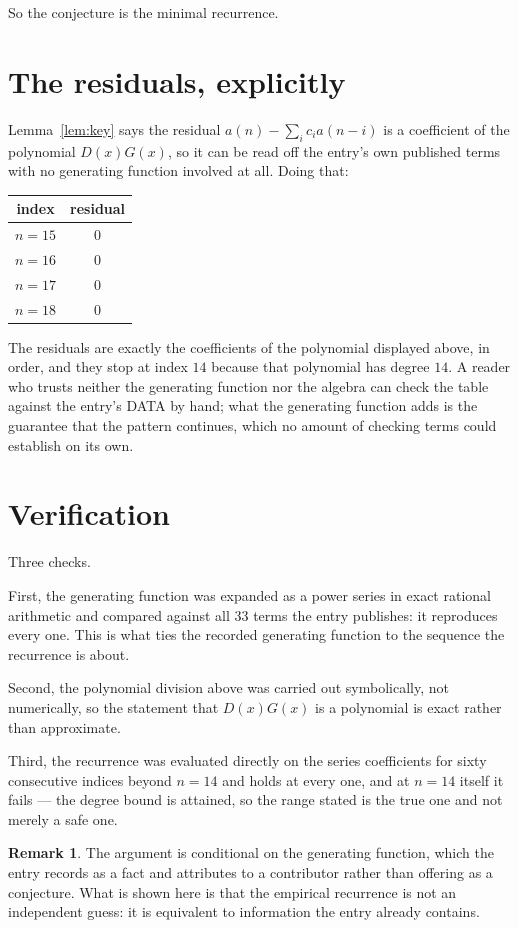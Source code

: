 \documentclass[11pt,a4paper]{article}
\theoremstyle{plain}
\theoremstyle{definition}
\newtheorem{remark}[theorem]{Remark}
\begin{document}
So the conjecture is the minimal recurrence.

\section{The residuals, explicitly}

Lemma~\ref{lem:key} says the residual $a(n)-\sum_ic_ia(n-i)$ is a coefficient of the
polynomial $D(x)G(x)$, so it can be read off the entry's own published terms with no
generating function involved at all. Doing that:
\begin{center}
\begin{tabular}{cc}
index & residual \\ \hline
$n=15$ & $0$ \\
$n=16$ & $0$ \\
$n=17$ & $0$ \\
$n=18$ & $0$
\end{tabular}
\end{center}
The residuals are exactly the coefficients of the polynomial displayed above, in order, and
they stop at index $14$ because that polynomial has degree $14$. A reader who trusts
neither the generating function nor the algebra can check the table against the entry's DATA
by hand; what the generating function adds is the guarantee that the pattern continues, which
no amount of checking terms could establish on its own.

\section{Verification}

Three checks.

First, the generating function was expanded as a power series in exact rational arithmetic and
compared against all $33$ terms the entry publishes: it reproduces every one. This is
what ties the recorded generating function to the sequence the recurrence is about.

Second, the polynomial division above was carried out symbolically, not numerically, so the
statement that $D(x)G(x)$ is a polynomial is exact rather than approximate.

Third, the recurrence was evaluated directly on the series coefficients for sixty consecutive
indices beyond $n=14$ and holds at every one, and at $n=14$ itself it fails --- the
degree bound is attained, so the range stated is the true one and not merely a safe one.

\begin{remark}
The argument is conditional on the generating function, which the entry records as a fact and
attributes to a contributor rather than offering as a conjecture. What is shown here is that
the empirical recurrence is not an independent guess: it is equivalent to information the
entry already contains.
\end{remark}
\end{document}
